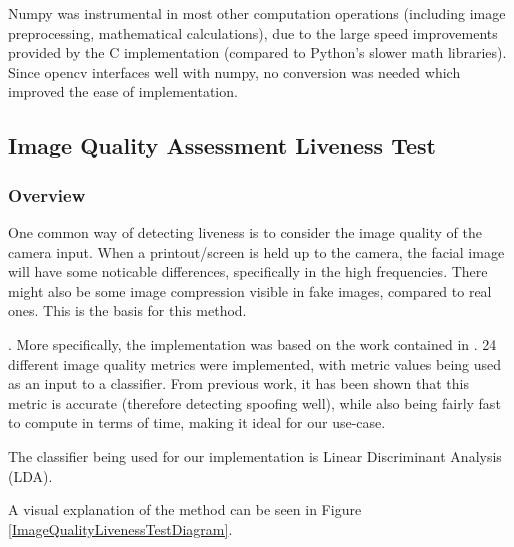 \documentclass[10pt,a4paper]{article}
\begin{document}
            Numpy was instrumental in most other computation operations (including image preprocessing, mathematical calculations), due to the large speed improvements provided by the C implementation (compared to Python's slower math libraries).
            Since opencv interfaces well with numpy, no conversion was needed which improved the ease of implementation.


        \subsection{Image Quality Assessment Liveness Test}
            \subsubsection{Overview}
            One common way of detecting liveness is to consider the image quality of the camera input. When a printout/screen is held up to the camera, the facial image
            will have some noticable differences, specifically in the high frequencies. There might also be some image compression visible in fake images, compared to real ones.
            This is the basis for this method.

            .
            More specifically, the implementation was based on the work contained in \cite{ImageQualityAssessmentTest}. 24 different image quality metrics were implemented,
            with metric values being used as an input to a classifier. From previous work, it has been shown that this metric is accurate (therefore detecting spoofing well), while
            also being fairly fast to compute in terms of time, making it ideal for our use-case.

            The classifier being used for our implementation is Linear Discriminant Analysis (LDA).

            A visual explanation of the method can be seen in Figure \ref{ImageQualityLivenessTestDiagram}. 
\end{document}
